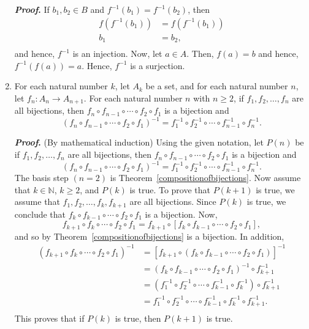 \begin{enumerate}
\textbf{\emph{Proof}.}  If $b_1, b_2 \in B$ and 
$f^{-1} \left( b_1 \right) = f^{-1} \left( b_2 \right)$, then
\[
\begin{aligned}
f \left( f^{-1} \left( b_1 \right) \right) &= f \left( f^{-1} \left( b_1 \right) \right) \\
                                       b_1 &= b_2, \\
\end{aligned}
\]
and hence, $f^{-1}$ is an injection.  Now, let $a \in A$.  Then, $f \left( a \right) = b$ and hence, $f^{-1} \left( f \left( a \right) \right) = a$.  Hence, $f^{-1}$ is a surjection.

\item For each natural number  $k$, let  $A_k $ be a set, and for each natural number  $n$, let  $f_n :A_n  \to A_{n + 1} $.  For each natural number  $n$  with  $n \geq 2$, if  $f_1 , f_2 ,  \ldots , f_n $ are all bijections, then  
$f_n  \circ f_{n - 1}  \circ  \cdots  \circ f_2  \circ f_1 $ is a bijection and
\[
\left( {f_n  \circ f_{n - 1}  \circ  \cdots  \circ f_2  \circ f_1 } \right)^{ - 1}  = f_1^{ - 1}  \circ f_2^{ - 1}  \circ  \cdots  \circ f_{n - 1}^{ - 1}  \circ f_n^{ - 1}.
\]

\textbf{\emph{Proof}.} (By mathematical induction)  Using the given notation, let 
$P \left( n \right)$ be if  $f_1 , f_2 ,  \ldots , f_n $ are all bijections, then  
$f_n  \circ f_{n - 1}  \circ  \cdots  \circ f_2  \circ f_1 $ is a bijection and
\[
\left( {f_n  \circ f_{n - 1}  \circ  \cdots  \circ f_2  \circ f_1 } \right)^{ - 1}  = f_1^{ - 1}  \circ f_2^{ - 1}  \circ  \cdots  \circ f_{n - 1}^{ - 1}  \circ f_n^{ - 1}.
\]
The basis step $\left( n = 2 \right)$ is Theorem~\ref{compositionofbijections}.  Now assume that $k \in \mathbb{N}$, $k \geq 2$, and $P \left( k \right)$ is true.  To prove that 
$P \left( k + 1 \right)$ is true, we assume that $f_1 , f_2 ,  \ldots , f_k, f_{k+1}$ are all bijections.  Since $P \left( k \right)$ is true, we conclude that 
$f_k  \circ f_{k - 1}  \circ  \cdots  \circ f_2  \circ f_1$ is a bijection.  Now, 
\[
f_{k+1}  \circ f_{k}  \circ  \cdots  \circ f_2  \circ f_1 = 
f_{k+1} \circ \left[ f_k  \circ f_{k - 1}  \circ  \cdots  \circ f_2  \circ f_1 \right],
\]
and so by Theorem~\ref{compositionofbijections} is a bijection.  In addition,
\[
\begin{aligned}
\left( {f_{k+1}  \circ f_{k}  \circ  \cdots  \circ f_2  \circ f_1 } \right)^{ - 1}  &= 
\left[ f_{k+1} \circ \left( f_k  \circ f_{k - 1}  \circ  \cdots  \circ f_2  \circ f_1 \right) \right]^{-1} \\
  &= \left( f_k  \circ f_{k - 1}  \circ  \cdots  \circ f_2  \circ f_1 \right)^{-1} \circ f_{k+1}^{-1} \\
  &= \left( f_1^{ - 1}  \circ f_2^{ - 1}  \circ  \cdots  \circ f_{k - 1}^{ - 1}  \circ f_k^{ - 1} \right) \circ f_{k+1}^{-1} \\
  &=f_1^{ - 1}  \circ f_2^{ - 1}  \circ  \cdots  \circ f_{k - 1}^{ - 1}  \circ f_k^{ - 1} \circ f_{k+1}^{-1}. \\
\end{aligned}
\]
This proves that if $P \left( k \right)$ is true, then $P \left( k + 1 \right)$ is true.




\end{enumerate}
